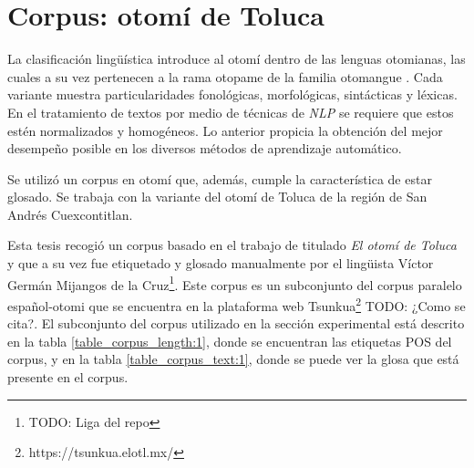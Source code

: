 \documentclass[letterpaper,12pt,oneside]{book}
\theoremstyle{definition}
\begin{document}
	

	\section{Corpus: otomí de Toluca}

	

	

	La clasificación lingüística introduce al otomí dentro de las lenguas otomianas, las cuales a su vez pertenecen a la rama otopame de la familia otomangue \citep{barrientos2004otomies}. Cada variante muestra particularidades fonológicas, morfológicas, sintácticas y léxicas. En el tratamiento de textos por medio de técnicas de \textit{NLP} se requiere que estos estén normalizados y homogéneos. Lo anterior propicia la obtención del mejor desempeño posible en los diversos métodos de aprendizaje automático.

	

	Se utilizó un corpus en otomí que, además, cumple la característica de estar glosado. Se trabaja con la variante del otomí de Toluca de la región de San Andrés Cuexcontitlan.

	

	Esta tesis recogió un corpus basado en el trabajo de \citet{lastra1992otomi} titulado \emph{El otomí de Toluca} y que a su vez fue etiquetado y glosado manualmente por el lingüista Víctor Germán Mijangos de la Cruz\footnote{TODO: Liga del repo}. Este corpus es un subconjunto del corpus paralelo español-otomi que se encuentra en la plataforma web Tsunkua\footnote{https://tsunkua.elotl.mx/} TODO: ¿Como se cita?. El subconjunto del corpus utilizado en la sección experimental está descrito en la tabla \ref{table_corpus_length:1}, donde se encuentran las etiquetas POS del corpus, y en la tabla \ref{table_corpus_text:1}, donde se puede ver la glosa que está presente en el corpus. 

	


	
\end{document}
